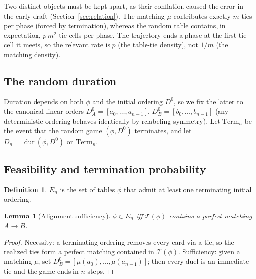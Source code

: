 \documentclass[11pt]{article}
\newtheorem{lemma}{Lemma}
\theoremstyle{definition}
\newtheorem{definition}{Definition}
\theoremstyle{remark}
\DeclareMathOperator{\dur}{dur}
\newcommand{\Term}{\mathrm{Term}}
\newcommand{\Tphi}{\mathcal{T}}
\begin{document}
Two distinct objects must be kept apart, as their conflation caused the error in the early draft (Section~\ref{sec:relation}).
The matching $\mu$ contributes exactly $m$ ties per phase (forced by termination), whereas the random table contains, in
expectation, $p\,m^2$ tie cells per phase. The trajectory ends a phase at the first tie cell it meets, so the relevant
rate is $p$ (the table-tie density), not $1/m$ (the matching density).

\subsection{The random duration}
Duration depends on both $\phi$ and the initial ordering $D^0$, so we fix the latter to the canonical linear orders
$D^0_A = [a_0, \dots, a_{n-1}]$, $D^0_B = [b_0, \dots, b_{n-1}]$ (any deterministic ordering behaves identically by
relabeling symmetry). Let $\Term_n$ be the event that the random game $(\phi, D^0)$ terminates, and let
$D_n = \dur(\phi, D^0)$ on $\Term_n$.

\subsection{Feasibility and termination probability}
\begin{definition}
$E_n$ is the set of tables $\phi$ that admit at least one terminating initial ordering.
\end{definition}

\begin{lemma}[Alignment sufficiency]\label{lem:align}
$\phi \in E_n$ iff $\Tphi(\phi)$ contains a perfect matching $A \to B$.
\end{lemma}
\begin{proof}
Necessity: a terminating ordering removes every card via a tie, so the realized ties form a perfect matching contained in
$\Tphi(\phi)$. Sufficiency: given a matching $\mu$, set $D^0_B = [\mu(a_0), \dots, \mu(a_{n-1})]$; then every duel is an
immediate tie and the game ends in $n$ steps.
\end{proof}
\end{document}

